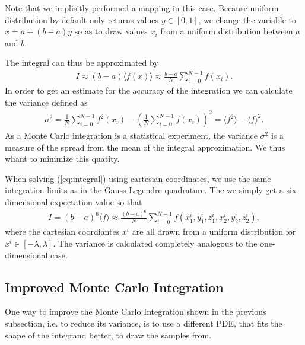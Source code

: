 \documentclass[twocolumn]{aastex62}
\begin{document}
Note that we implisitly performed a mapping in this case. Because uniform
distribution by default only returns values $y\in[0, 1]$, we change the variable
to $x = a + (b-a)y$ so as to draw values $x_i$ from a uniform distribution
between $a$ and $b$. 

The integral can thus be approximated by 
\begin{align}
	I \approx (b-a)\langle f(x) \rangle \approx \frac{b-a}{N}\sum^{N-1}_{i=0}f(x_i).
\end{align}
In order to get an estimate for the accuracy of the integration we can calculate
the variance defined as 
\begin{align}
	\sigma^2 = \frac{1}{N}\sum_{i=0}^{N-1} f^2(x_i) - \left(\frac{1}{N}\sum_{i=0}^{N-1}f(x_i)\right)^2 = \langle f^2\rangle - \langle f\rangle^2.
\end{align}
As a Monte Carlo integration is a statistical experiment, the variance
$\sigma^2$ is a measure of the spread from the mean of the integral
approximation. We thus whant to minimize this quatity.

When solving (\ref{eq:integral}) using cartesian coordinates, we use the same
integration limits as in the Gauss-Legendre quadrature. The we simply get a
six-dimensional expectation value so that 
\begin{align}
	I = (b-a)^6\langle f \rangle \approx \frac{(b-a)^6}{N}\sum^{N-1}_{i=0} f(x_1^i, y_1^i, z_1^i, x_2^i, y_2^i, z_2^i),
\end{align}
where the cartesian coordiantes $x^i$ are all drawn from a uniform distribution
for $x^i\in[-\lambda, \lambda]$. The variance is calculated completely analogous
to the one-dimensional case. 

\subsection{Improved Monte Carlo Integration}\label{subsec:improved_monte_carlo}
One way to improve the Monte Carlo Integration shown in the previous subsection,
i.e. to reduce its variance, is to use a different PDE, that fits the shape of
the integrand better, to draw the samples from.
\end{document}

